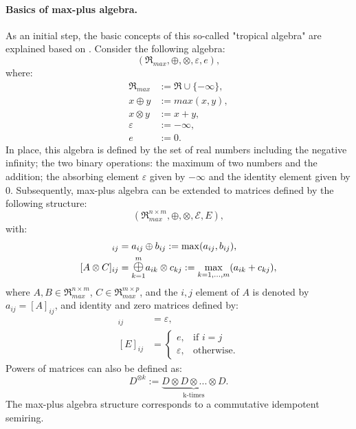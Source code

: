 \documentclass[main.tex]{subfiles}
\begin{document}
\paragraph{Basics of max-plus algebra.}As an initial step, the basic concepts of this so-called "tropical algebra" are explained based on \cite{Schutter2008}. Consider the following algebra:
\begin{equation}
	(\Re_{max}, \oplus, \otimes, \varepsilon, e),
\end{equation}
where:
\begin{align}
	\Re_{max} &:= \Re \cup \{-\infty\}, \nonumber\\
	x \oplus y &:= max(x,y), \nonumber\\
	x \otimes y &:= x + y, \nonumber\\
	\varepsilon &:= -\infty, \nonumber\\
	e &:= 0. \nonumber
\end{align}
In place, this algebra is defined by the set of real numbers including the negative infinity; the two binary operations: the maximum of two numbers and the addition; the absorbing element $\varepsilon$ given by $-\infty$ and the identity element given by $0$. Subsequently, max-plus algebra can be extended to matrices defined by the following structure:
\begin{equation}
	(\Re_{max}^{n\times m}, \oplus, \otimes,\mathcal{E}, E),
\end{equation}
with:
\begin{align}
	[A \oplus B]_{ij} &= a_{ij} \oplus b_{ij} := \max(a_{ij},b_{ij}), \nonumber \\
	[A \otimes C]_{ij} &= \underset{k=1}{\overset{m}{\mathlarger{\mathlarger\oplus}}}a_{ik} \otimes c_{kj} := \max\limits_{k=1,...,m}(a_{ik} + c_{kj}), \nonumber 
\end{align}
where $A,B \in \Re_{max}^{n\times m}$, $C \in \Re_{max}^{m\times p}$, and the $i,j$ element of $A$ is denoted by $a_{ij} = [A]_{ij}$, and identity and zero matrices defined by:
\begin{align}
	[\mathcal{E}]_{ij} &= \varepsilon, \nonumber \\
	[E]_{ij} &= \begin{cases}
		e, & \text{if } i =j \\
		\varepsilon,& \text{otherwise.}
	\end{cases} \nonumber
\end{align}
Powers of matrices can also be defined as:
\begin{equation}
	D^{\otimes k} :=\underbrace{ D \otimes D \otimes... \otimes D}_\text{k-times}.
\end{equation}
The max-plus algebra structure corresponds to a commutative idempotent semiring. 
\end{document}

